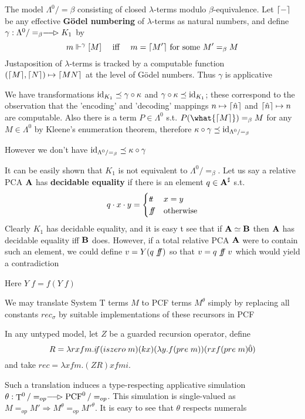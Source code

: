 \documentclass[11pt]{article}
\newcommand{\FF}{f\mspace{-7mu}f}
\newcommand{\TT}{t\mspace{-3mu}t}
\newcommand{\IF}{i\mspace{-4mu}f}
\DeclareMathOperator{\PCF}{PCF}
\DeclareMathOperator{\tT}{T}
\begin{document}
\begin{examplle}[]
The model \(\Lambda^0/=\beta\) consisting of closed \(\lambda\)-terms modulo \(\beta\)-equivalence. Let \(\lceil - \rceil\) be
any effective \textbf{Gödel numbering} of \(\lambda\)-terms as natural numbers, and define \(\gamma:\Lambda^0/=_\beta\lrarhd K_1\) by
\begin{equation*}
m\Vdash^\gamma[M]\quad\text{ iff }\quad m=\lceil M' \rceil\text{ for some }M'=_\beta M
\end{equation*}
Justaposition of \(\lambda\)-terms is tracked by a computable function \((\lceil M \rceil,\lceil N \rceil)\mapsto\lceil MN \rceil\)
at the level of Gödel numbers. Thus \(\gamma\) is applicative

We have transformations \(\operatorname{id}_{K_1}\preceq\gamma\circ\kappa\) and \(\gamma\circ\kappa\preceq\operatorname{id}_{K_1}\); these correspond to the
observation that the 'encoding' and 'decoding' mappings \(n\mapsto\lceil \hat{n} \rceil\)
and \(\lceil \hat{n} \rceil\mapsto n\)
are computable. Also there is a term \(P\in\Lambda^0\) s.t. \(P(\what{\ceil{M}})=_\beta M\) for any \(M\in\Lambda^0\) by
Kleene's enumeration theorem, therefore \(\kappa\circ\gamma\preceq\operatorname{id}_{\Lambda^0/=_\beta}\)

However we don't have \(\operatorname{id}_{\Lambda^0/=_\beta}\preceq\kappa\circ\gamma\)

It can be easily shown that \(K_1\) is not equivalent to \(\Lambda^0/=_\beta\). Let us say a relative
PCA \(\operatorname{\textbf{A}}\) has \textbf{decidable equality} if there is an element \(q\in\operatorname{\textbf{A}}^\sharp\) s.t.
\begin{equation*}
q\cdot x\cdot y=
\begin{cases}
\TT&x=y\\
\FF&\text{otherwise}
\end{cases}
\end{equation*}
Clearly \(K_1\) has decidable equality, and it is easy t see that if \(\operatorname{\textbf{A}}\simeq\operatorname{\textbf{B}}\) then \(\operatorname{\textbf{A}}\) has
decidable equality iff \(\operatorname{\textbf{B}}\) does. However, if a total relative PCA \(\operatorname{\textbf{A}}\) were to contain such
an element, we could define \(v=Y(q\;\FF)\) so that \(v=q\;\FF\;v\) which would yield a
contradiction

Here \(Y\;f=f(Y\; f)\)
\end{examplle}



\begin{examplle}[]
We may translate System T terms \(M\) to PCF terms \(M^\theta\) simply by replacing all
constants \(rec_\sigma\) by suitable implementations of these recursors in PCF

In any untyped model, let \(Z\) be a guarded recursion operator,
define
\begin{equation*}
R=\lambda rxfm.\IF(iszero\;m)(kx)(\lambda y.f(pre\;m))(rxf(pre\; m)\hat{0})
\end{equation*}
and take \(rec=\lambda xfm.(ZR)xfmi\).

Such a translation induces a type-respecting applicative
simulation \(\theta:\tT^0/=_{op}\lrarhd \PCF^0/=_{op}\). This simulation is single-valued
as \(M=_{op}M'\Rightarrow M^\theta=_{op}M'^\theta\). It is easy to see that \(\theta\) respects numerals
\end{examplle}
\end{document}
